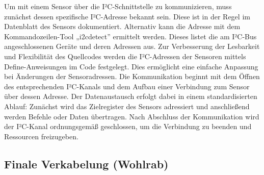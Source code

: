 Um mit einem Sensor über die I²C-Schnittstelle zu kommunizieren, muss zunächst dessen spezifische I²C-Adresse bekannt sein. 
Diese ist in der Regel im Datenblatt des Sensors dokumentiert. 
Alternativ kann die Adresse mit dem Kommandozeilen-Tool „i2cdetect” ermittelt werden. 
Dieses listet die am I²C-Bus angeschlossenen Geräte und deren Adressen aus.
Zur Verbesserung der Lesbarkeit und Flexibilität des Quellcodes werden die I²C-Adressen der Sensoren mittels Define-Anweisungen im Code festgelegt. 
Dies ermöglicht eine einfache Anpassung bei Änderungen der Sensoradressen.
Die Kommunikation beginnt mit dem Öffnen des entsprechenden I²C-Kanals und dem Aufbau einer Verbindung zum Sensor über dessen Adresse. 
Der Datenaustausch erfolgt dabei in einem standardisierten Ablauf: 
Zunächst wird das Zielregister des Sensors adressiert und anschließend werden Befehle oder Daten übertragen. 
Nach Abschluss der Kommunikation wird der I²C-Kanal ordnungsgemäß geschlossen, um die Verbindung zu beenden und Ressourcen freizugeben.

\subsection{Finale Verkabelung (Wohlrab)}

